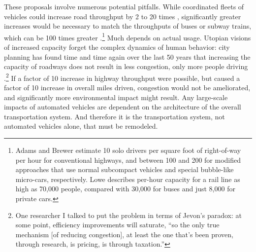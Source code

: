 These proposals involve numerous potential pitfalls. While coordinated
fleets of vehicles could increase road throughput by 2 to 20
times \cite[p. 229]{adamsBrewerRoadways}, significantly greater
increases would be necessary to match the 
throughputs of buses or subway trains, which can be 100 times
greater \cite[p. 222]{loweCars}.\footnote{Adams and Brewer
  estimate 10 solo drivers per square foot of right-of-way per
  hour for conventional highways, and between 100 and 200 for
  modified approaches that use normal subcompact vehicles and special
  bubble-like micro-cars, respectively. Lowe describes
  per-hour capacity for 
  a rail line as high as 70,000 people, compared with 30,000 for buses
and just 8,000 for private cars.} Much depends on actual usage.
Utopian visions of increased capacity forget the complex dynamics of
human behavior: city planning has found 
time and time again over the last 50 years that increasing the
capacity of roadways does not result in less congestion, only more
people driving \cite[p. 219]{marshallFuture}.\footnote{One researcher I talked
to put the problem in terms of Jevon's paradox: at some point,
efficiency improvements will saturate, ``so the only true mechanism
[of reducing congestion],
at least the one that's been proven, through research, is pricing, is
through taxation.''} If a factor of 10
increase in highway throughput were possible, but caused a factor of
10 increase in overall miles driven, congestion would not be
ameliorated, and significantly more environmental impact might result. Any
large-scale impacts of automated vehicles are dependent on the
architecture of the overall transportation system. And therefore it is
the transportation system, not automated vehicles alone, that must be remodeled.




